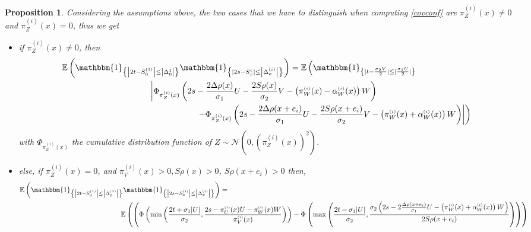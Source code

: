 \documentclass[12pt]{article}
\theoremstyle{Theorem}
\newtheorem{Proposition}[Theorem]{Proposition}
\begin{document}
\begin{Proposition}
\label{PropositionFourCell}
Considering the assumptions above, the two cases that we have to distinguish when computing \eqref{covconf} are $\pi^{\scriptscriptstyle(i)}_{Z}(x) \neq 0$ and $\pi^{\scriptscriptstyle(i)}_{Z}(x) = 0$, thus we get 
\begin{itemize}
  \item if $\pi^{\scriptscriptstyle(i)}_{Z}(x) \neq 0$, then 
  {\small 
\begin{align}
\label{Thisthofour}
\mathbb{E}\left(\mathbbm{1}_{\left\{ \left|2t - S^{\scriptscriptstyle (1)}_{\scriptscriptstyle 0}\right| \leq \left|\Delta^{\scriptscriptstyle 1}_{\scriptscriptstyle 0}\right|\right\}}\mathbbm{1}_{\left\{ \left|2s - S^{\scriptscriptstyle i}_{\scriptscriptstyle x}\right| \leq \left|\Delta^{\scriptscriptstyle (i)}_x\right| \right\}}\right) & = \mathbb{E}\left(\mathbbm{1}_{\left\{ |t - \frac{\sigma_2V}{2}| \leq |\frac{\sigma_1U}{2}|\right\}}\right. \\
& \hspace{-6cm} \left. \left|\Phi_{ \pi^{\scriptscriptstyle(i)}_{Z}(x)}\left( 2s - \frac{2\Delta \rho(x) }{\sigma_1} U - \frac{2S\rho(x)}{\sigma_{2}}V - \left( \pi^{\scriptscriptstyle(i)}_{W}(x) -  \alpha^{\scriptscriptstyle(i)}_{W}(x)\right) W \right) \right. \right.  \nonumber \\
& \hspace{-4cm}\left. \left.  - \Phi_{ \pi^{\scriptscriptstyle(i)}_{Z}(x)}\left( 2s - \frac{2\Delta \rho(x+e_i) }{\sigma_1}U - \frac{2S \rho(x+e_i) }{\sigma_{2}}V - \left( \pi^{\scriptscriptstyle(i)}_{W}(x) +  \alpha^{\scriptscriptstyle(i)}_{W}(x) \right)W \right)  \right| \right)
\end{align}
}with $\Phi_{\pi^{\scriptscriptstyle(i)}_{Z}(x)}$ the cumulative distribution function of $Z \sim \mathcal{N}(0, (\pi^{\scriptscriptstyle(i)}_{Z}(x))^{2})$.
\item else, if $\pi^{\scriptscriptstyle(i)}_{Z}(x) = 0$, and $\pi^{\scriptscriptstyle (i)}_{V}(x) > 0, S\rho(x) > 0$, $S\rho(x+e_i) > 0$ then, 
{\tiny
\begin{align}
\label{thisthothree}
\mathbb{E}\left(\mathbbm{1}_{\left\{ \left|2t - S^{\scriptscriptstyle (1)}_{\scriptscriptstyle 0}\right| \leq \left|\Delta^{\scriptscriptstyle (1)}_{\scriptscriptstyle 0}\right|\right\}}\mathbbm{1}_{\left\{ \left|2s - S^{\scriptscriptstyle (i)}_{\scriptscriptstyle x}\right| \leq \left|\Delta^{\scriptscriptstyle (i)}_x\right| \right\}}\right) & = \\
& \hspace{-5cm} \mathbb{E}\left(\left(\Phi\left( \min\left(\frac{2t + \sigma_{1}|U|}{\sigma_{2}}, \frac{2s - \pi^{\scriptscriptstyle (i)}_{U}(x)U - \pi^{\scriptscriptstyle (i)}_{W}(x)W}{\pi^{\scriptscriptstyle (i)}_{V}(x)}\right)\right) - \Phi\left(\max\left(\frac{2t - \sigma_{1}|U|}{\sigma_{2}},\frac{\sigma_{2}\left(2s - 2\frac{\Delta\rho(x+e_i)}{\sigma_1}U -  \left(\pi^{\scriptscriptstyle (i)}_{W}(x) + \alpha^{\scriptscriptstyle (i)}_{W}(x)\right)W\right)}{2S\rho(x+e_i)}\right) \right) \right)\right.\\

\end{align}}
\end{itemize}
\end{Proposition}
\end{document}
